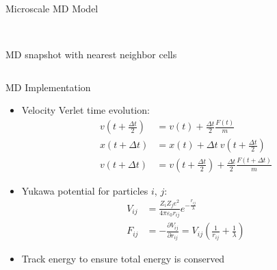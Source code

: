 \documentclass{beamer}
\begin{document}
\begin{frame}[t]{Microscale MD Model}
\begin{itemize}
\begin{columns}
\begin{column}{0.4\textwidth}
\begin{center}
						\\\tiny MD snapshot with nearest neighbor cells
					\end{center}
				\end{column}
			\end{columns}
		\end{itemize}
	\end{frame}
	
	\begin{frame}{MD Implementation}
		\begin{itemize}
			\item  Velocity Verlet time evolution:\vspace{-0.2em}
			\small\begin{align*}
			v\left(t+\frac{\Delta t}{2}\right) &= v(t) + \frac{\Delta t}{2}\frac{F(t)}{m} \\
			x(t+\Delta t) &= x(t) + \Delta t\:v\left(t+\frac{\Delta t}{2}\right) \\
			v(t+\Delta t) &= v\left(t+\frac{\Delta t}{2}\right) + \frac{\Delta t}{2}\frac{F(t+\Delta t)}{m}
			\end{align*}\normalsize
			\item  Yukawa potential for particles $i$, $j$:\vspace{-0.2em}
			\small\begin{align*}
			V_{ij} &= \frac{Z_iZ_je^2}{4\pi\varepsilon_0r_{ij}}e^{-\frac{r_{ij}}{\lambda}} \\
			F_{ij} &= -\frac{\partial V_{ij}}{\partial r_{ij}} = V_{ij}\left(\frac{1}{r_{ij}}+\frac{1}{\lambda}\right)
			\end{align*}\normalsize
			\item  Track energy to ensure total energy is conserved
		\end{itemize}
	\let\thefootnote\relax{}
	\end{frame}
	
\end{document}
